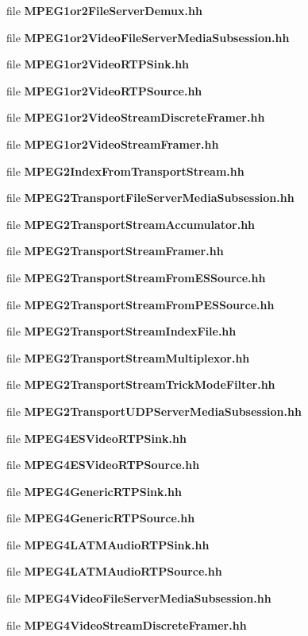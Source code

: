 \begin{DoxyCompactItemize}
\item 
file {\bf M\+P\+E\+G1or2\+File\+Server\+Demux.\+hh}
\item 
file {\bf M\+P\+E\+G1or2\+Video\+File\+Server\+Media\+Subsession.\+hh}
\item 
file {\bf M\+P\+E\+G1or2\+Video\+R\+T\+P\+Sink.\+hh}
\item 
file {\bf M\+P\+E\+G1or2\+Video\+R\+T\+P\+Source.\+hh}
\item 
file {\bf M\+P\+E\+G1or2\+Video\+Stream\+Discrete\+Framer.\+hh}
\item 
file {\bf M\+P\+E\+G1or2\+Video\+Stream\+Framer.\+hh}
\item 
file {\bf M\+P\+E\+G2\+Index\+From\+Transport\+Stream.\+hh}
\item 
file {\bf M\+P\+E\+G2\+Transport\+File\+Server\+Media\+Subsession.\+hh}
\item 
file {\bf M\+P\+E\+G2\+Transport\+Stream\+Accumulator.\+hh}
\item 
file {\bf M\+P\+E\+G2\+Transport\+Stream\+Framer.\+hh}
\item 
file {\bf M\+P\+E\+G2\+Transport\+Stream\+From\+E\+S\+Source.\+hh}
\item 
file {\bf M\+P\+E\+G2\+Transport\+Stream\+From\+P\+E\+S\+Source.\+hh}
\item 
file {\bf M\+P\+E\+G2\+Transport\+Stream\+Index\+File.\+hh}
\item 
file {\bf M\+P\+E\+G2\+Transport\+Stream\+Multiplexor.\+hh}
\item 
file {\bf M\+P\+E\+G2\+Transport\+Stream\+Trick\+Mode\+Filter.\+hh}
\item 
file {\bf M\+P\+E\+G2\+Transport\+U\+D\+P\+Server\+Media\+Subsession.\+hh}
\item 
file {\bf M\+P\+E\+G4\+E\+S\+Video\+R\+T\+P\+Sink.\+hh}
\item 
file {\bf M\+P\+E\+G4\+E\+S\+Video\+R\+T\+P\+Source.\+hh}
\item 
file {\bf M\+P\+E\+G4\+Generic\+R\+T\+P\+Sink.\+hh}
\item 
file {\bf M\+P\+E\+G4\+Generic\+R\+T\+P\+Source.\+hh}
\item 
file {\bf M\+P\+E\+G4\+L\+A\+T\+M\+Audio\+R\+T\+P\+Sink.\+hh}
\item 
file {\bf M\+P\+E\+G4\+L\+A\+T\+M\+Audio\+R\+T\+P\+Source.\+hh}
\item 
file {\bf M\+P\+E\+G4\+Video\+File\+Server\+Media\+Subsession.\+hh}
\item 
file {\bf M\+P\+E\+G4\+Video\+Stream\+Discrete\+Framer.\+hh}
\item 

\end{DoxyCompactItemize}
